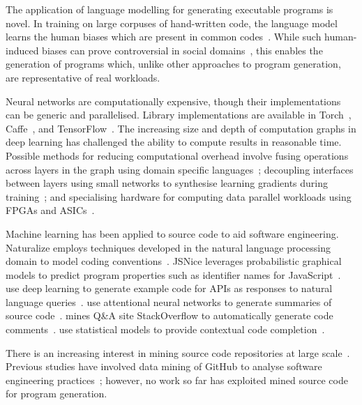 The application of language modelling for generating executable programs is novel. In training on large corpuses of hand-written code, the language model learns the human biases which are present in common codes~\cite{Caliskan-islam2016}. While such human-induced biases can prove controversial in social domains~\cite{Bolukbasi2016,Joseph2017}, this enables the generation of programs which, unlike other approaches to program generation, are representative of real workloads.

Neural networks are computationally expensive, though their implementations can be generic and parallelised. Library implementations are available in Torch~\cite{Collobert2011}, Caffe~\cite{Jia2014}, and TensorFlow~\cite{Abadi}. The increasing size and depth of computation graphs in deep learning has challenged the ability to compute results in reasonable time. Possible methods for reducing computational overhead involve fusing operations across layers in the graph using domain specific languages~\cite{Truong2016,Ashari2015a,Potter2015}; decoupling interfaces between layers using small networks to synthesise learning gradients during training~\cite{Jaderberg2016a}; and specialising hardware for computing data parallel workloads using FPGAs and ASICs~\cite{Misra2010}.


Machine learning has been applied to source code to aid software engineering.  Naturalize employs techniques developed in the natural language processing domain to model coding conventions~\cite{Allamanis2014a}. JSNice leverages probabilistic graphical models to predict program properties such as identifier names for JavaScript~\cite{Raychev}. \citeauthor{Zhang2015a} use deep learning to generate example code for APIs as responses to natural language queries~\cite{Zhang2015a}. \citeauthor{Allamanis2016} use attentional neural networks to generate summaries of source code~\cite{Allamanis2016}. \citeauthor{Wong2013} mines Q\&A site StackOverflow to automatically generate code comments~\cite{Wong2013}. \citeauthor{Raychev2014} use statistical models to provide contextual code completion~\cite{Raychev2014}.

There is an increasing interest in mining source code repositories at large scale~\cite{Allamanis2013a,White2015a,Bird2009}. Previous studies have involved data mining of GitHub to analyse software engineering practices~\cite{Wu2014,Guzman2014,Baishakhi2014a,Vasilescu2015}; however, no work so far has exploited mined source code for program generation.


